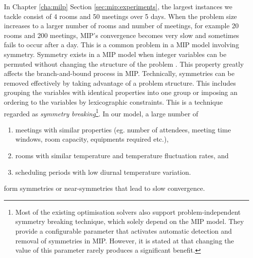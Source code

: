 In Chapter \ref{cha:milp} Section \ref{sec:mip:experiments}, the largest instances we tackle consist of 4 rooms and 50 meetings over 5 days. When the problem size increases to a larger number of rooms and number of meetings, for example 20 rooms and 200 meetings, MIP's convergence becomes very slow and sometimes fails to occur after a day. This is a common problem in a MIP model involving symmetry. Symmetry exists in a MIP model when integer variables can be permuted without changing the structure of the problem \citep{margot2010symmetry}. This property greatly affects the branch-and-bound process in MIP. 
Technically, symmetries can be removed effectively by taking advantage of a problem structure. This includes grouping the variables with identical properties into one group or imposing an ordering to the variables by lexicographic constraints.
This is a technique regarded as \textsl{symmetry breaking}\footnote{Most of the existing optimisation solvers \citep{gurobi, cplex2009v12} also support problem-independent symmetry breaking technique, which solely depend on the MIP model. They provide a configurable parameter that activates automatic detection and removal of symmetries in MIP. However, it is stated at \cite{gurobisym} that changing the value of this parameter rarely produces a significant benefit.}. In our model, a large number of 
\vspace*{-2px}
\begin{enumerate}
	\item meetings with similar properties (eg. number of attendees, meeting time windows, room capacity, equipments required etc.),    \label{sym1} 
	\item rooms with similar temperature and temperature fluctuation rates, and  \label{sym2}
	\item scheduling periods with low diurnal temperature variation.  \label{sym3}
\end{enumerate}
\noindent form symmetries or near-symmetries that lead to slow convergence. 
